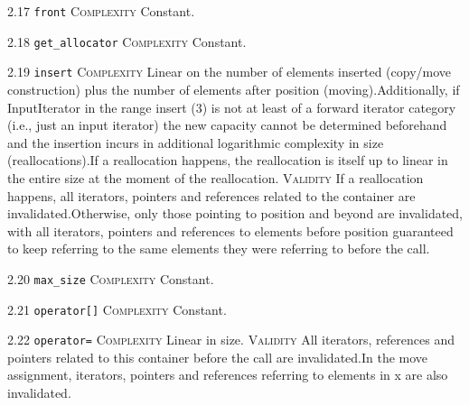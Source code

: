 \noindent\textcolor{cgreen}{2.17 \texttt{front}} \textsc{Complexity} Constant. \vspace{0.5em}

\noindent\textcolor{cgreen}{2.18 \texttt{get\_allocator}} \textsc{Complexity} Constant. \vspace{0.5em}

\noindent\textcolor{corange}{2.19 \texttt{insert}} \textsc{Complexity} Linear on the number of elements inserted (copy/move construction) plus the number of elements after position (moving).Additionally, if InputIterator in the range insert (3) is not at least of a forward iterator category (i.e., just an input iterator) the new capacity cannot be determined beforehand and the insertion incurs in additional logarithmic complexity in size (reallocations).If a reallocation happens, the reallocation is itself up to linear in the entire size at the moment of the reallocation. \textsc{Validity} If a reallocation happens, all iterators, pointers and references related to the container are invalidated.Otherwise, only those pointing to position and beyond are invalidated, with all iterators, pointers and references to elements before position guaranteed to keep referring to the same elements they were referring to before the call.\vspace{0.5em}

\noindent\textcolor{cgreen}{2.20 \texttt{max\_size}} \textsc{Complexity} Constant. \vspace{0.5em}

\noindent\textcolor{cgreen}{2.21 \texttt{operator[]}} \textsc{Complexity} Constant. \vspace{0.5em}

\noindent\textcolor{corange}{2.22 \texttt{operator=}} \textsc{Complexity} Linear in size. \textsc{Validity} All iterators, references and pointers related to this container before the call are invalidated.In the move assignment, iterators, pointers and references referring to elements in x are also invalidated.\vspace{0.5em}

